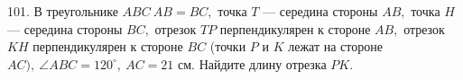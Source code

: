 101. В треугольнике $ABC\ AB=BC,$ точка $T$ --- середина стороны $AB,$ точка $H$ --- середина стороны $BC,$ отрезок $TP$ перпендикулярен к стороне $AB,$ отрезок $KH$ перпендикулярен к стороне $BC$ (точки $P$ и $K$ лежат на стороне $AC),\ \angle ABC=120^\circ,\ AC=21$ см. Найдите длину отрезка $PK.$\\
